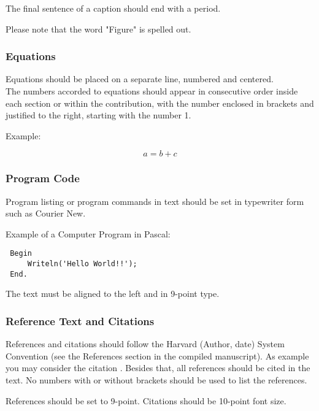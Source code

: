 \documentclass[a4paper,twoside]{article}
\begin{document}
The final sentence of a caption should end with a period.



Please note that the word "Figure" is spelled out.

\subsubsection{Equations}

Equations should be placed on a separate line, numbered and
centered.\\The numbers accorded to equations should appear in
consecutive order inside each section or within the contribution,
with the number enclosed in brackets and justified to the right,
starting with the number 1.

Example:

\begin{equation}\label{eq1}
    a=b+c
\end{equation}

\subsubsection{Program Code}\label{subsubsec:program_code}

Program listing or program commands in text should be set in
typewriter form such as Courier New.

Example of a Computer Program in Pascal:

\begin{small}
\begin{verbatim}
 Begin
     Writeln('Hello World!!');
 End.
\end{verbatim}
\end{small}


The text must be aligned to the left and in 9-point type.

\subsubsection{Reference Text and Citations}

References and citations should follow the Harvard (Author, date)
System Convention (see the References section in the compiled
manuscript). As example you may consider the citation
\cite{Smith98}. Besides that, all references should be cited in the
text. No numbers with or without brackets should be used to list the
references.

References should be set to 9-point. Citations should be 10-point
font size.
\end{document}
